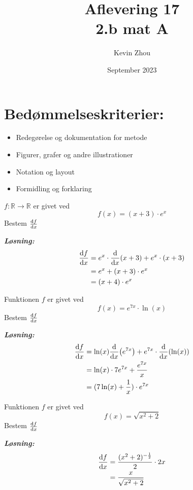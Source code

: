 \documentclass{article}
\title{Aflevering 17\\
{\Large \textbf{2.b mat A}}}
\author{Kevin Zhou}
\date{September 2023}
\newcommand{\sol}{\setlength{\parindent}{0cm}\textbf{\textit{Løsning:}}\setlength{\parindent}{1cm}}
\begin{document}
\maketitle
\section*{Bedømmelseskriterier:}
\begin{itemize}
    \setlength\itemsep{3cm}
    \Large
    \item  Redegørelse og dokumentation for metode
    \item Figurer, grafer og andre illustrationer
    \item Notation og layout
    \item Formidling og forklaring
\end{itemize}
\pagebreak
\begin{question}{}{}
$f:\mathbb{R} \to \mathbb{R}$ er givet ved
\[
  f(x)=(x+3) \cdot e^x
\] 
Bestem $\dv{f}{x}$   
\end{question}
\sol  
\begin{equation*}
\begin{split}
  \dv{f}{x}&=e^x\cdot \dv{x} (x+3) + e^x \cdot (x+3) \\ 
  &= e^x+(x+3)\cdot e^x \\ 
  &= (x+4)\cdot e^x
\end{split}
\end{equation*}

\begin{question}{}{}
Funktionen $f$ er givet ved
\[
  f(x)=e^{7x} \cdot \ln (x)
\] 
Bestem $\dv{f}{x}$   
\end{question}
\sol 
\begin{equation*}
\begin{split}
  \dv{f}{x} &= \ln (x) \dv{x}(e^{7x}) + e^{7x}\cdot \dv{x} (\ln (x))\\ 
  &= \ln (x)\cdot 7e^{7x} + \frac{e^{7x}}{x}\\ 
  &= (7\ln(x)+\frac{1}{x}) \cdot e^{7x}
\end{split}
\end{equation*}

\begin{question}{}{}
Funktionen $f$ er givet ved 
\[
  f(x)=\sqrt{x^2+2} 
\] 
Bestem $\dv{f}{x}$   
\end{question}
\sol 
\begin{equation*}
\begin{split}
  \dv{f}{x}&= \frac{(x^2+2)^{-\frac{1}{2}}}{2} \cdot 2x \\ 
  &= \frac{x}{\sqrt{x^2+2} }
\end{split}
\end{equation*}
\end{document}
